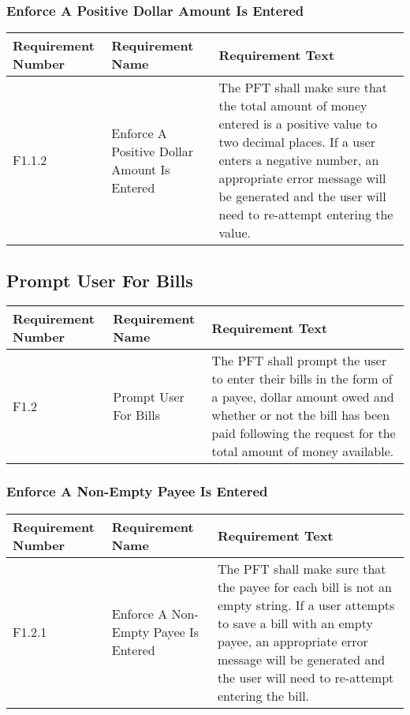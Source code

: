 \documentclass{article}
\begin{document}
\subsubsection{Enforce A Positive Dollar Amount Is Entered}

\begin{longtable}{|p{2cm}|p{6cm}| p{6cm}|}
    \hline
    \textbf{Requirement Number} & \textbf{Requirement Name} & \textbf{Requirement Text}\\
    \hline
    F1.1.2 & Enforce A Positive Dollar Amount Is Entered & The PFT shall make sure that the total amount of money entered is a positive value to two decimal places. If a user enters a negative number, an appropriate error message will be generated and the user will need to re-attempt entering the value. \\
    \hline
\end{longtable}

\subsection{Prompt User For Bills}

\begin{longtable}{|p{2cm}|p{6cm}| p{6cm}|}
    \hline
    \textbf{Requirement Number} & \textbf{Requirement Name} & \textbf{Requirement Text}\\
    \hline
    F1.2 & Prompt User For Bills & The PFT shall prompt the user to enter their bills in the form of a payee, dollar amount owed and whether or not the bill has been paid following the request for the total amount of money available. \\
    \hline
\end{longtable}


\subsubsection{Enforce A Non-Empty Payee Is Entered}

\begin{longtable}{|p{2cm}|p{6cm}| p{6cm}|}
    \hline
    \textbf{Requirement Number} & \textbf{Requirement Name} & \textbf{Requirement Text}\\
    \hline
    F1.2.1 & Enforce A Non-Empty Payee Is Entered & The PFT shall make sure that the payee for each bill is not an empty string. If a user attempts to save a bill with an empty payee, an appropriate error message will be generated and the user will need to re-attempt entering the bill. \\
    \hline
\end{longtable}
\end{document}
